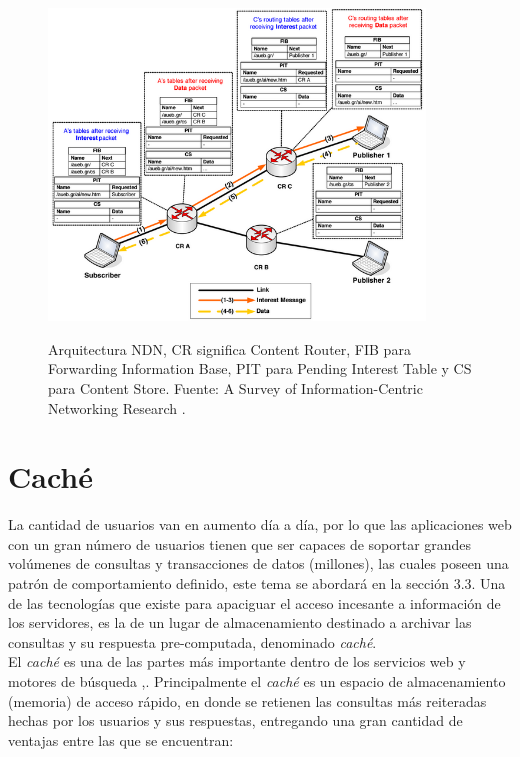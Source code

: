 \documentclass[12pt]{ociamthesis}  %
\begin{document}
	\begin{figure}[!htb]
		\centering
		\includegraphics[width=10cm]{Nodo2.png}\\
		\caption{Arquitectura NDN, CR significa Content Router, FIB para Forwarding Information Base, PIT para Pending Interest Table y CS para Content Store. Fuente: A Survey of Information-Centric Networking Research \cite{xylomenos2014survey}.}
		\label{Arquitectura_ndn}
	\end{figure}


\section{Caché}
La cantidad de usuarios van en aumento día a día, por lo que las aplicaciones web con un gran número de usuarios tienen que ser capaces de soportar grandes volúmenes de consultas y transacciones de datos (millones), las cuales poseen una patrón de comportamiento definido, este tema se abordará en la sección 3.3. Una de las tecnologías que existe para apaciguar el acceso incesante a información de los servidores, es la de un lugar de almacenamiento destinado a archivar las consultas y su respuesta pre-computada, denominado \textit{caché}.\\

El \textit{caché} es una de las partes más importante dentro de los servicios web y motores de búsqueda \cite{altingovde2009cost},\cite{aggarwal1999caching}. Principalmente el \textit{caché} es un espacio de almacenamiento (memoria) de acceso rápido, en donde se retienen las consultas más reiteradas hechas por los usuarios y sus respuestas, entregando una gran cantidad de ventajas entre las que se encuentran:
\end{document}
